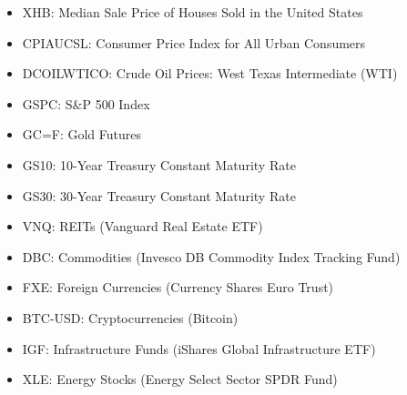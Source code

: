 \documentclass{article}
\begin{document}
\begin{itemize}
    \item XHB: Median Sale Price of Houses Sold in the United States
    \item CPIAUCSL: Consumer Price Index for All Urban Consumers
    \item DCOILWTICO: Crude Oil Prices: West Texas Intermediate (WTI)
    \item GSPC: S\&P 500 Index
    \item GC=F: Gold Futures
    \item GS10: 10-Year Treasury Constant Maturity Rate
    \item GS30: 30-Year Treasury Constant Maturity Rate
    \item VNQ: REITs (Vanguard Real Estate ETF)
    \item DBC: Commodities (Invesco DB Commodity Index Tracking Fund)
    \item FXE: Foreign Currencies (Currency Shares Euro Trust)
    \item BTC-USD: Cryptocurrencies (Bitcoin)
    \item IGF: Infrastructure Funds (iShares Global Infrastructure ETF)
    \item XLE: Energy Stocks (Energy Select Sector SPDR Fund)
\end{itemize}
\end{document}
